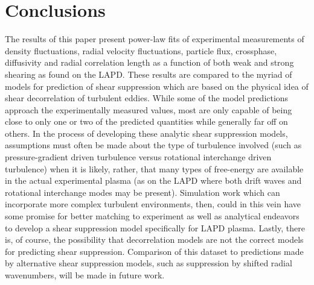 \documentclass[aip,pop,amsmath,amssymb,preprint,superscriptaddress]{revtex4-1} %
\begin{document}
\section{Conclusions}

The results of this paper present power-law fits of experimental measurements of density fluctuations, radial velocity fluctuations, particle flux, crossphase, diffusivity and radial correlation length as a function of both weak and strong shearing as found on the LAPD. These results are compared to the myriad of models for prediction of shear suppression which are based on the physical idea of shear decorrelation of turbulent eddies. While some of the model predictions approach the experimentally measured values, most are only capable of being close to only one or two of the predicted quantities while generally far off on others. In the process of developing these analytic shear suppression models, assumptions must often be made about the type of turbulence involved (such as pressure-gradient driven turbulence versus rotational interchange driven turbulence) when it is likely, rather, that many types of free-energy are available in the actual experimental plasma (as on the LAPD where both drift waves and rotational interchange modes may be present). Simulation work which can incorporate more complex turbulent environments, then, could in this vein have some promise for better matching to experiment as well as analytical endeavors to develop a shear suppression model specifically for LAPD plasma. Lastly, there is, of course, the possibility that decorrelation models are not the correct models for predicting shear suppression. Comparison of this dataset to predictions made by alternative shear suppression models, such as suppression by shifted radial wavenumbers\cite{stabler}, will be made in future work.
\end{document}
